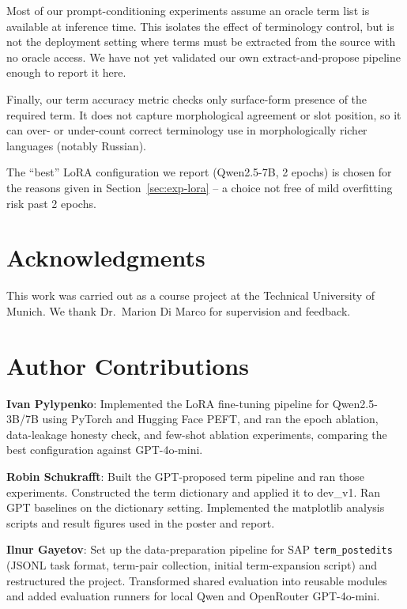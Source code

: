 \documentclass[11pt]{article}
\begin{document}
Most of our prompt-conditioning experiments assume an oracle term list is available at inference time. This isolates the effect of terminology control, but is not the deployment setting where terms must be extracted from the source with no oracle access. We have not yet validated our own extract-and-propose pipeline enough to report it here.

Finally, our term accuracy metric checks only surface-form presence of the required term. It does not capture morphological agreement or slot position, so it can over- or under-count correct terminology use in morphologically richer languages (notably Russian).

The ``best'' LoRA configuration we report (Qwen2.5-7B, 2 epochs) is chosen for the reasons given in Section~\ref{sec:exp-lora} -- a choice not free of mild overfitting risk past 2 epochs.

\section*{Acknowledgments}

This work was carried out as a course project at the Technical University of Munich. We thank Dr.\ Marion Di Marco for supervision and feedback.

\section*{Author Contributions}

\textbf{Ivan Pylypenko}: Implemented the LoRA fine-tuning pipeline for Qwen2.5-3B/7B using PyTorch and Hugging Face PEFT, and ran the epoch ablation, data-leakage honesty check, and few-shot ablation experiments, comparing the best configuration against GPT-4o-mini.

\textbf{Robin Schukrafft}: Built the GPT-proposed term pipeline and ran those experiments. Constructed the term dictionary and applied it to dev\_v1. Ran GPT baselines on the dictionary setting. Implemented the matplotlib analysis scripts and result figures used in the poster and report.

\textbf{Ilnur Gayetov}: Set up the data-preparation pipeline for SAP \texttt{term\_postedits} (JSONL task format, term-pair collection, initial term-expansion script) and restructured the project. Transformed shared evaluation into reusable modules and added evaluation runners for local Qwen and OpenRouter GPT-4o-mini.


\end{document}

